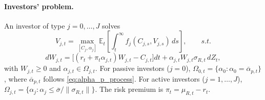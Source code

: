 
\paragraph{Investors' problem.} 

An investor of type $j = 0,\ldots,J$ solves
\begin{equation}\label{eq:inv-problem}
    V_{j,t} = \max_{[C_j,\alpha_j]} 
    \mathbb{E}_t \left[ \int_t^\infty f_j(C_{j,s},V_{j,s})\, ds \right], \qquad s.t.
\end{equation}
\begin{equation}
dW_{j,t} = \big[(r_t + \pi_t \alpha_{j,t}) W_{j,t} - C_{j,t}\big] dt 
    + \alpha_{j,t} W_{j,t} \sigma_{R,t}\, dZ_t,
\end{equation}
with $W_{j,t} \geq 0$ and $\alpha_{j,t} \in \Omega_{j,t}$. For passive investors ($j=0$),  
$\Omega_{0,t} = \{\alpha_0: \alpha_0 = \overline{\alpha}_{p,t}\}$, where $\overline{\alpha}_{p,t}$ follows \eqref{eq:alpha_p_process}. For active investors ($j=1,\ldots,J$),  
$\Omega_{j,t} = \{\alpha_j: \alpha_j \leq \overline{\sigma}/\|\sigma_{R,t}\|\}$. 
The risk premium is $\pi_t = \mu_{R,t} - r_t$.  

